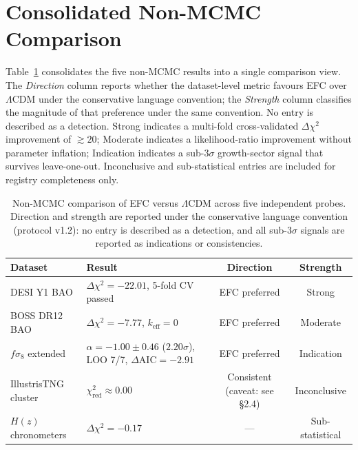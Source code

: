 \documentclass[11pt,a4paper]{article}
\begin{document}
\section{Consolidated Non-MCMC Comparison}

Table~\ref{tab:consolidated} consolidates the five non-MCMC results into a single comparison view. The \emph{Direction} column reports whether the dataset-level metric favours EFC over $\Lambda$CDM under the conservative language convention; the \emph{Strength} column classifies the magnitude of that preference under the same convention. No entry is described as a detection. Strong indicates a multi-fold cross-validated $\Delta\chi^2$ improvement of $\gtrsim 20$; Moderate indicates a likelihood-ratio improvement without parameter inflation; Indication indicates a sub-$3\sigma$ growth-sector signal that survives leave-one-out. Inconclusive and sub-statistical entries are included for registry completeness only.

\begin{table}[!ht]
\centering
\small
\renewcommand{\arraystretch}{1.5}
\begin{tabularx}{\textwidth}{@{}lXcc@{}}
\toprule
\textbf{Dataset} & \textbf{Result} & \textbf{Direction} & \textbf{Strength} \\
\midrule
\rowcolor{lavgreen}
DESI Y1 BAO & $\Delta\chi^2 = -22.01$, 5-fold CV passed & EFC preferred & Strong \\
\rowcolor{lavgreen}
BOSS DR12 BAO & $\Delta\chi^2 = -7.77$, $k_{\mathrm{eff}} = 0$ & EFC preferred & Moderate \\
\rowcolor{lavgreen}
$f\sigma_8$ extended & $\alpha = -1.00 \pm 0.46$ ($2.20\sigma$), LOO 7/7, $\Delta\mathrm{AIC} = -2.91$ & EFC preferred & Indication \\
\rowcolor{warnyellow}
IllustrisTNG cluster & $\chi^2_{\mathrm{red}} \approx 0.00$ & Consistent (caveat: see \S2.4) & Inconclusive \\
\rowcolor{lightgray}
$H(z)$ chronometers & $\Delta\chi^2 = -0.17$ & --- & Sub-statistical \\
\bottomrule
\end{tabularx}
\caption{Non-MCMC comparison of EFC versus $\Lambda$CDM across five independent probes. Direction and strength are reported under the conservative language convention (protocol v1.2): no entry is described as a detection, and all sub-$3\sigma$ signals are reported as indications or consistencies.}
\label{tab:consolidated}
\end{table}
\end{document}
